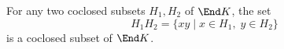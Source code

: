 For any two coclosed subsets $H_1, H_2$ of $\End K$, the set
$$H_1 H_2 = \{xy \mid x \in H_1,\; y \in H_2\}$$
is a coclosed subset of $\End K$.
